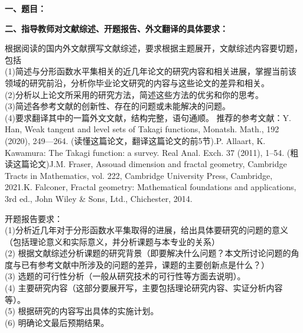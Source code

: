 {
    \setlength{\parindent}{0em}
    \par {\bfseries 一、题目：\Title}
    \par {\bfseries 二、指导教师对文献综述、开题报告、外文翻译的具体要求：}

    根据阅读的国内外文献撰写文献综述，要求根据主题展开，文献综述内容要切题，包括\\
          (1)简述与分形函数水平集相关的近几年论文的研究内容和相关进展，掌握当前该领域的研究前沿，分析你毕业论文研究的内容与这些论文的差异和相关。\\
          (2)分析以上论文所采用的研究方法，简述这些方法的优劣和你的思考。\\
          (3)简述各参考文献的创新性、存在的问题或未能解决的问题。\\
          (4)要求翻译其中的一篇外文文献，结构完整，语句通顺。
    推荐的参考文献：\newline
          [1] Y. Han, Weak tangent and level sets of Takagi functions, Monatsh. Math., 192 (2020), 249—264. (读懂这篇论文，翻译这篇论文的前5节).\newline
          [2] P. Allaart, K. Kawamura: The Takagi function: a survey. Real Anal. Exch. 37 (2011), 1–54. (粗读这篇论文)\newline
          [3] J.M. Fraser, Assouad dimension and fractal geometry, Cambridge Tracts in Mathematics, vol. 222, Cambridge University Press, Cambridge, 2021.\newline
          [4] K. Falconer, Fractal geometry: Mathematical foundations and applications, 3rd ed., John Wiley \& Sons, Ltd., Chichester, 2014.


    开题报告要求：\\
          (1)分析近几年对于分形函数水平集取得的进展，给出具体要研究的问题的意义（包括理论意义和实际意义，并分析课题与本专业的关系）\\
          (2) 根据文献综述分析课题的研究背景（即要解决什么问题？本文所讨论问题的角度与已有参考文献中所涉及的问题的差异，课题的主要创新点是什么？）\\
          (3) 选题的可行性分析（一般从研究技术的可行性等方面去说明）。\\
          (4) 主要研究内容（这部分要展开写，主要包括理论研究内容、实证分析内容等）。\\
          (5) 根据研究的内容写出具体的实施计划。\\
          (6) 明确论文最后预期结果。


}

\mbox{} \vfill

\signature{指导教师（签名）}
